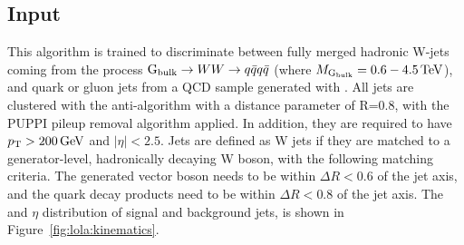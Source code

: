 \subsection{Input}
This algorithm is trained to discriminate between fully merged hadronic W-jets coming from the process $\mathrm{G}_\mathrm{bulk} \rightarrow WW \rightarrow q\bar{q}q\bar{q}$ (where $M_{\mathrm{G}_\mathrm{bulk}}=0.6-4.5\,\text{Te\hspace{-.08em}V}$), and quark or gluon jets from a QCD sample generated with . All jets are clustered with the anti-\kt algorithm with a distance parameter of R=0.8, with the PUPPI pileup removal algorithm applied. In addition, they are required to have $p_{\mathrm{T}} > 200 \,\text{Ge\hspace{-.08em}V}$ and $|\eta| < 2.5$. Jets are defined as W jets if they are matched to a generator-level, hadronically decaying W boson, with the following matching criteria. The generated vector boson needs to be within $\Delta R < 0.6$ of the jet axis, and the quark decay products need to be within $\Delta R < 0.8$ of the jet axis. The \PT and $\eta$ distribution of signal and background jets, is shown in Figure~\ref{fig:lola:kinematics}.
